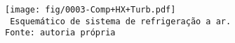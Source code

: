     \begin{frame}\vspace*{-0em}
        \begin{center}
            \begin{figure}
                \fontsize{3.0}{4}\selectfont
                \texttt{[image: fig/0003-Comp+HX+Turb.pdf]}
                \\\vspace*{-0.0em}\texttt{%
                    Esquemático de sistema de refrigeração a ar.\\
                    Fonte: autoria própria
                }
            \end{figure}
        \end{center}
    \end{frame}

    \begin{frame}\vspace*{-0em}
    \end{frame}

    \begin{frame}\vspace*{-0em}
    \end{frame}

    \begin{frame}\vspace*{-0em}
    \end{frame}

    \begin{frame}\vspace*{-0em}
    \end{frame}

